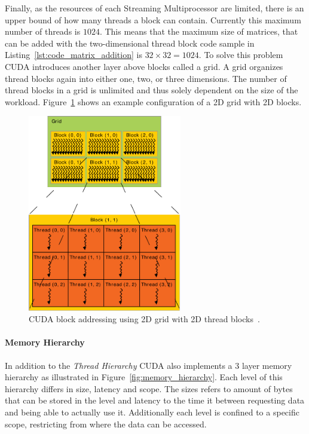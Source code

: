 Finally, as the resources of each Streaming Multiprocessor are limited, there is an upper bound of how many threads a block can contain. Currently this maximum number of threads is $1024$. This means that the maximum size of matrices, that can be added with the two-dimensional thread block code sample in Listing~\ref{lst:code_matrix_addition} is $32\times32 = 1024$. To solve this problem CUDA introduces another layer above blocks called a grid. A grid organizes thread blocks again into either one, two, or three dimensions. The number of thread blocks in a grid is unlimited and thus solely dependent on the size of the workload. Figure~\ref{fig:grid_blocks} shows an example configuration of a 2D grid with 2D blocks.

\begin{figure}[!htbp]
  \centering
  \includegraphics[width=0.6\textwidth]{img/grid_blocks.pdf}
  \caption[CUDA block addressing using 2D grid with 2D thread blocks.]{CUDA block addressing using 2D grid with 2D thread blocks~\cite{CudaProgrammingGuide}.}
  \label{fig:grid_blocks}
\end{figure}

\paragraph{Memory Hierarchy}

In addition to the \emph{Thread Hierarchy} CUDA also implements a 3 layer memory hierarchy as illustrated in Figure~\ref{fig:memory_hierarchy}. Each level of this hierarchy differs in size, latency and scope. The sizes refers to amount of bytes that can be stored in the level and latency to the time it between requesting data and being able to actually use it. Additionally each level is confined to a specific scope, restricting from where the data can be accessed.

